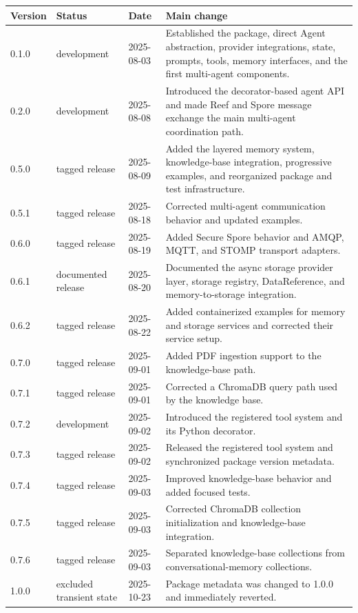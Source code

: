 \begin{tabular}{llll}
\hline
Version & Status & Date & Main change \\
\hline
0.1.0 & development & 2025-08-03 & Established the package, direct Agent abstraction, provider integrations, state, prompts, tools, memory interfaces, and the first multi-agent components. \\
0.2.0 & development & 2025-08-08 & Introduced the decorator-based agent API and made Reef and Spore message exchange the main multi-agent coordination path. \\
0.5.0 & tagged release & 2025-08-09 & Added the layered memory system, knowledge-base integration, progressive examples, and reorganized package and test infrastructure. \\
0.5.1 & tagged release & 2025-08-18 & Corrected multi-agent communication behavior and updated examples. \\
0.6.0 & tagged release & 2025-08-19 & Added Secure Spore behavior and AMQP, MQTT, and STOMP transport adapters. \\
0.6.1 & documented release & 2025-08-20 & Documented the async storage provider layer, storage registry, DataReference, and memory-to-storage integration. \\
0.6.2 & tagged release & 2025-08-22 & Added containerized examples for memory and storage services and corrected their service setup. \\
0.7.0 & tagged release & 2025-09-01 & Added PDF ingestion support to the knowledge-base path. \\
0.7.1 & tagged release & 2025-09-01 & Corrected a ChromaDB query path used by the knowledge base. \\
0.7.2 & development & 2025-09-02 & Introduced the registered tool system and its Python decorator. \\
0.7.3 & tagged release & 2025-09-02 & Released the registered tool system and synchronized package version metadata. \\
0.7.4 & tagged release & 2025-09-03 & Improved knowledge-base behavior and added focused tests. \\
0.7.5 & tagged release & 2025-09-03 & Corrected ChromaDB collection initialization and knowledge-base integration. \\
0.7.6 & tagged release & 2025-09-03 & Separated knowledge-base collections from conversational-memory collections. \\
1.0.0 & excluded transient state & 2025-10-23 & Package metadata was changed to 1.0.0 and immediately reverted. \\

\end{tabular}

